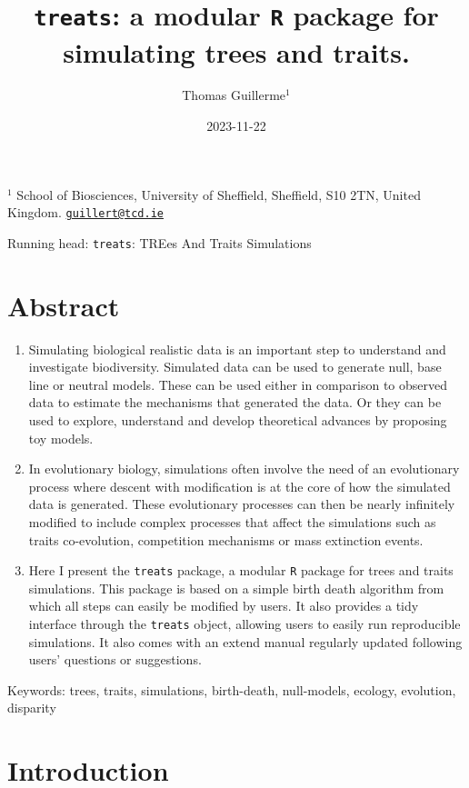 \documentclass[
]{article}
\title{\texttt{treats}: a modular \texttt{R} package for simulating
trees and traits.}
\author{Thomas Guillerme\(^1\)}
\date{2023-11-22}
\begin{document}
\maketitle

\(^1\) School of Biosciences, University of Sheffield, Sheffield, S10
2TN, United Kingdom.
\href{mailto:guillert@tcd.ie}{\nolinkurl{guillert@tcd.ie}}

Running head: \texttt{treats}: TREes And Traits Simulations

\hypertarget{abstract}{%
\section{Abstract}\label{abstract}}

\begin{enumerate}
\def\labelenumi{\arabic{enumi}.}
\item
  Simulating biological realistic data is an important step to
  understand and investigate biodiversity. Simulated data can be used to
  generate null, base line or neutral models. These can be used either
  in comparison to observed data to estimate the mechanisms that
  generated the data. Or they can be used to explore, understand and
  develop theoretical advances by proposing toy models.
\item
  In evolutionary biology, simulations often involve the need of an
  evolutionary process where descent with modification is at the core of
  how the simulated data is generated. These evolutionary processes can
  then be nearly infinitely modified to include complex processes that
  affect the simulations such as traits co-evolution, competition
  mechanisms or mass extinction events.
\item
  Here I present the \texttt{treats} package, a modular \texttt{R}
  package for trees and traits simulations. This package is based on a
  simple birth death algorithm from which all steps can easily be
  modified by users. It also provides a tidy interface through the
  \texttt{treats} object, allowing users to easily run reproducible
  simulations. It also comes with an extend manual regularly updated
  following users' questions or suggestions.
\end{enumerate}

Keywords: trees, traits, simulations, birth-death, null-models, ecology,
evolution, disparity

\hypertarget{introduction}{%
\section{Introduction}\label{introduction}}
\end{document}

